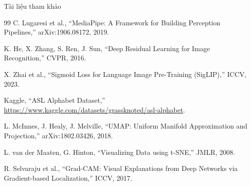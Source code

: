 \documentclass[t, aspectratio=169]{beamer} %
\begin{document}
	\begin{frame}[allowframebreaks]{Tài liệu tham khảo}
		\begin{thebibliography}{99}
			C. Lugaresi et al., ``MediaPipe: A Framework for Building Perception Pipelines,'' arXiv:1906.08172, 2019.

			K. He, X. Zhang, S. Ren, J. Sun, ``Deep Residual Learning for Image Recognition,'' CVPR, 2016.

			X. Zhai et al., ``Sigmoid Loss for Language Image Pre-Training (SigLIP),'' ICCV, 2023.

			Kaggle, ``ASL Alphabet Dataset,'' \url{https://www.kaggle.com/datasets/grassknoted/asl-alphabet}.

			L. McInnes, J. Healy, J. Melville, ``UMAP: Uniform Manifold Approximation and Projection,'' arXiv:1802.03426, 2018.

			L. van der Maaten, G. Hinton, ``Visualizing Data using t-SNE,'' JMLR, 2008.

			R. Selvaraju et al., ``Grad-CAM: Visual Explanations from Deep Networks via Gradient-based Localization,'' ICCV, 2017.
		\end{thebibliography}
	\end{frame}

	\hustthankyou
\end{document}
